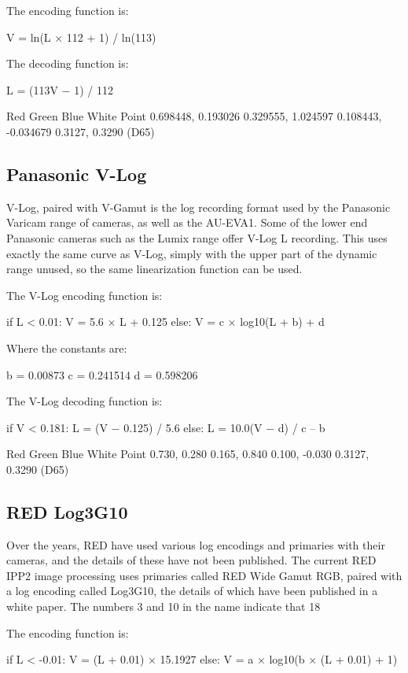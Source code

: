 The encoding function is:

	V = ln(L × 112 + 1) / ln(113)



The decoding function is:

	L = (113V − 1) / 112


Red
Green
Blue
White Point
0.698448, 0.193026
0.329555, 1.024597
0.108443, -0.034679
0.3127, 0.3290 (D65)

\subsection{Panasonic V-Log}

V-Log, paired with V-Gamut is the log recording format used by the Panasonic Varicam range of cameras, as well as the AU-EVA1. Some of the lower end Panasonic cameras such as the Lumix range offer V-Log L recording. This uses exactly the same curve as V-Log, simply with the upper part of the dynamic range unused, so the same linearization function can be used.

The V-Log encoding function is:

	if L < 0.01:
		V = 5.6 × L + 0.125
	else:
		V = c × log10(L + b) + d

Where the constants are:

	b = 0.00873
c = 0.241514
d = 0.598206



The V-Log decoding function is:

	if V < 0.181:
		L = (V − 0.125) / 5.6
	else:
		L = 10.0(V − d) / c – b


Red
Green
Blue
White Point
0.730, 0.280
0.165, 0.840
0.100, -0.030
0.3127, 0.3290 (D65)

\subsection{RED Log3G10}
Over the years, RED have used various log encodings and primaries with their cameras, and the details of these have not been published. The current RED IPP2 image processing uses primaries called RED Wide Gamut RGB, paired with a log encoding called Log3G10, the details of which have been published in a white paper. The numbers 3 and 10 in the name indicate that 18%

The encoding function is:

	if L < -0.01:
		V = (L + 0.01) × 15.1927
	else:
		V = a × log10(b × (L + 0.01) + 1)

